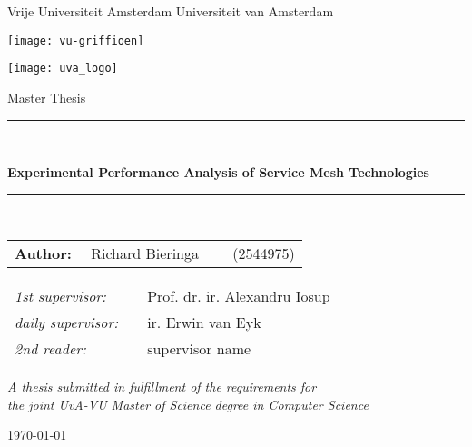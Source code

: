 \thispagestyle{empty}

\begin{center}
Vrije Universiteit Amsterdam \hspace*{2cm} Universiteit van Amsterdam

\vspace{1mm}

\hspace*{-7.5cm}\texttt{[image: vu-griffioen]}

\vspace*{-2cm}\hspace*{7.5cm}\texttt{[image: uva\_logo]}

\vspace{2cm}

{\Large Master Thesis}

\vspace*{1.5cm}

\rule{.9\linewidth}{.6pt}\\[0.4cm]
{\huge \bfseries Experimental Performance Analysis of Service Mesh Technologies \par}\vspace{0.4cm}
\rule{.9\linewidth}{.6pt}\\[1.5cm]

\vspace*{2mm}

{\Large
\begin{tabular}{l}
{\bf Author:} ~~Richard Bieringa~~~~ (2544975)
\end{tabular}
}

\vspace*{2cm}

\begin{tabular}{ll}
{\it 1st supervisor:}   & ~~Prof. dr. ir. Alexandru Iosup \\
{\it daily supervisor:} & ~~ir. Erwin van Eyk \\
{\it 2nd reader:}       & ~~supervisor name
\end{tabular}

\vspace*{2.5cm}

\textit{A thesis submitted in fulfillment of the requirements for\\ the joint UvA-VU Master of Science degree in Computer Science}

\vspace*{1.8cm}

\today\\[4cm] %

\end{center}